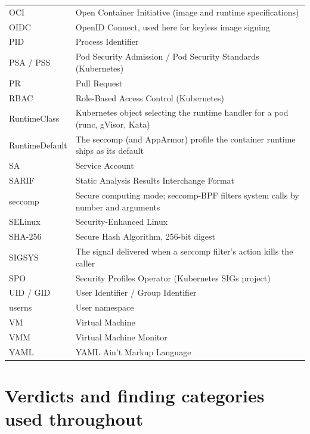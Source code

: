 \begin{longtable}{@{}p{3.3cm}p{11.9cm}@{}}
OCI & Open Container Initiative (image and runtime specifications)\\
OIDC & OpenID Connect, used here for keyless image signing\\
PID & Process Identifier\\
PSA / PSS & Pod Security Admission / Pod Security Standards (Kubernetes)\\
PR & Pull Request\\
RBAC & Role-Based Access Control (Kubernetes)\\
RuntimeClass & Kubernetes object selecting the runtime handler for a pod (runc, gVisor, Kata)\\
RuntimeDefault & The seccomp (and AppArmor) profile the container runtime ships as its default\\
SA & Service Account\\
SARIF & Static Analysis Results Interchange Format\\
seccomp & Secure computing mode; seccomp-BPF filters system calls by number and arguments\\
SELinux & Security-Enhanced Linux\\
SHA-256 & Secure Hash Algorithm, 256-bit digest\\
SIGSYS & The signal delivered when a seccomp filter's action kills the caller\\
SPO & Security Profiles Operator (Kubernetes SIGs project)\\
UID / GID & User Identifier / Group Identifier\\
userns & User namespace\\
VM & Virtual Machine\\
VMM & Virtual Machine Monitor\\
YAML & YAML Ain't Markup Language\\
\end{longtable}

\section*{Verdicts and finding categories used throughout}

